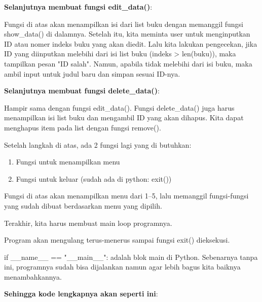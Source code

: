 
\par\textbf{Selanjutnya membuat fungsi edit\_data()}:

Fungsi di atas akan menampilkan isi dari list buku dengan memanggil fungsi show\_data() di dalamnya. Setelah itu, kita meminta user untuk menginputkan ID atau nomer indeks buku yang akan diedit. Lalu kita lakukan pengecekan, jika ID yang diinputkan melebihi dari isi list buku (indeks > len(buku)), maka tampilkan pesan "ID salah". Namun, apabila tidak melebihi dari isi buku, maka ambil input untuk judul baru dan simpan sesuai ID-nya.
\par \textbf{Selanjutnya membuat fungsi delete\_data()}:

Hampir sama dengan fungsi edit\_data(). Fungsi delete\_data() juga harus menampilkan isi list buku dan mengambil ID yang akan dihapus. Kita dapat menghapus item pada list dengan fungsi remove().
 \par Setelah langkah di atas, ada 2 fungsi lagi yang di butuhkan:
 \begin{enumerate}
     \item Fungsi untuk menampilkan menu
     \item Fungsi untuk keluar (sudah ada di python: exit())
 \end{enumerate}

Fungsi di atas akan menampilkan menu dari 1–5, lalu memanggil fungsi-fungsi yang sudah dibuat berdasarkan menu yang dipilih.

Terakhir, kita harus membuat main loop programnya.

Program akan mengulang terus-menerus sampai fungsi exit() dieksekusi.

if \_\_name\_\_ == "\_\_main\_\_": adalah blok main di Python. Sebenarnya tanpa ini, programnya sudah bisa dijalankan namun agar lebih bagus kita baiknya menambahkannya.
\par\textbf{Sehingga kode lengkapnya akan seperti ini}:
